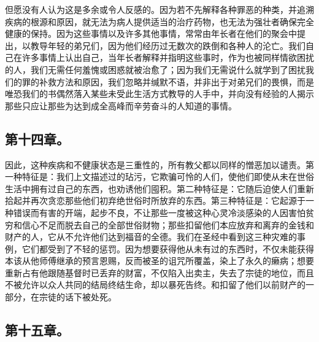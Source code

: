 但愿没有人认为这是多余或令人反感的。因为若不先解释各种罪恶的种类，并追溯疾病的根源和原因，就无法为病人提供适当的治疗药物，也无法为强壮者确保完全健康的保持。因为这些事情以及许多其他事情，常常由年长者在他们的聚会中提出，以教导年轻的弟兄们，因为他们经历过无数次的跌倒和各种人的沦亡。我们自己在许多事情上认出自己，当年长者解释并指明这些事时，作为也被同样情欲困扰的人，我们无需任何羞愧或困惑就被治愈了；因为我们无需说什么就学到了困扰我们的罪的补救方法和原因，我们忽略并缄默不语，并非出于对弟兄们的畏惧，而是唯恐我们的书偶然落入某些未受此生活方式教导的人手中，并向没有经验的人揭示那些只应让那些为达到成全高峰而辛劳奋斗的人知道的事情。\par


\subsection{第十四章。}

\par

因此，这种疾病和不健康状态是三重性的，所有教父都以同样的憎恶加以谴责。第一种特征是：我们上文描述过的玷污，它欺骗可怜的人们，使他们即使从未在世俗生活中拥有过自己的东西，也劝诱他们囤积。第二种特征是：它随后迫使人们重新拾起并再次贪恋那些他们初弃绝世俗时所放弃的东西。第三种特征是：它起源于一种错误而有害的开端，起步不良，不让那些一度被这种心灵冷淡感染的人因害怕贫穷和信心不足而脱去自己的全部世俗财物；那些扣留他们本应放弃和离弃的金钱和财产的人，它从不允许他们达到福音的全德。我们在圣经中看到这三种灾难的事例，它们都受到了不轻的惩罚。因为想要获得他从未有过的东西时，不仅未能获得本该从他师傅继承的预言恩赐，反而被圣的诅咒所覆盖，染上了永久的癞病；想要重新占有他跟随基督时已丢弃的财富，不仅陷入出卖主，失去了宗徒的地位，而且不被允许以众人共同的结局终结生命，却以暴死告终。和扣留了他们以前财产的一部分，在宗徒的话下被处死。\par


\subsection{第十五章。}

\par

